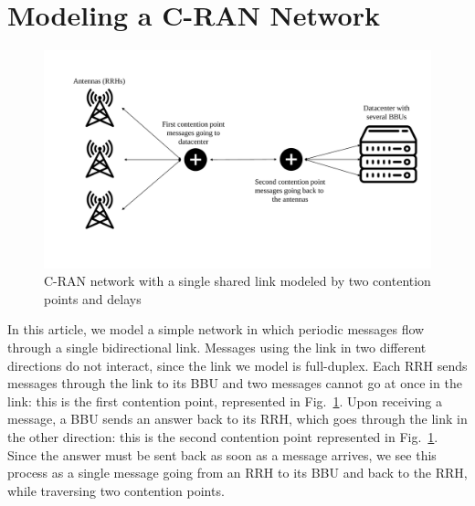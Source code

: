 \documentclass[pdflatex,sn-mathphys,iicol]{sn-jnl}%
\theoremstyle{thmstyleone}%
\theoremstyle{thmstyletwo}%
\theoremstyle{thmstylethree}%
\begin{document}
\section{Modeling a C-RAN Network}\label{sec:model}
\begin{center}
\begin{figure}

\centering
\includegraphics[scale=0.22]{network3.pdf} 


\caption{C-RAN network with a single shared link modeled by two contention points and delays}
\label{fig:model}
\end{figure}
\end{center}

In this article, we model a simple network in which periodic messages flow through a single bidirectional link. Messages using the link in two different directions do not interact, since the link we model is full-duplex.
 Each RRH sends messages through the link to its BBU and two messages cannot go at once in the link: this is the first contention point, represented in Fig.~\ref{fig:model}. Upon receiving a message, a BBU sends an answer back to its RRH, which goes through the link in the other direction: this is the second contention point represented in Fig.~\ref{fig:model}. Since the answer must be sent back as soon as a message arrives, we see this process as a single message going from an RRH to its BBU and back to the RRH, while traversing two contention points. 
\end{document}
